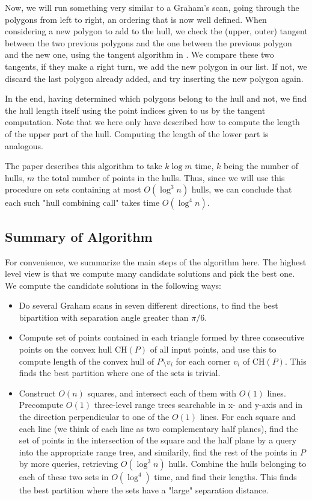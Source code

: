 \documentclass{article}
\begin{document}
Now, we will run something very similar to a Graham's scan, going through the polygons from left to right, an ordering that is now well defined. When considering a new polygon to add to the hull, we check the (upper, outer) tangent between the two previous polygons and the one between the previous polygon and the new one, using the tangent algorithm in \cite{ks95}. We compare these two tangents, if they make a right turn, we add the new polygon in our list. If not, we discard the last polygon  already added, and try inserting the new polygon again.

In the end, having determined which polygons belong to the hull and not, we find the hull length itself using the point indices given to us by the tangent computation. Note that we here only have described how to compute the length of the upper part of the hull. Computing the length of the lower part is analogous. 

The paper \cite{abb17} describes this algorithm to take $k \log m$ time, $k$ being the number of hulls, $m$ the total number of points in the hulls. Thus, since we will use this procedure on sets containing at most $O(\log^3 n)$ hulls, we can conclude that each such "hull combining call" takes time $O(\log^4 n)$.

\subsection{Summary of Algorithm} \label{sub:summary_of_algorithm}

For convenience, we summarize the main steps of the algorithm here. The highest level view is that we compute many candidate solutions and pick the best one. We compute the candidate solutions in the following ways:

\begin{itemize}
    \item Do several Graham scans in seven different directions, to find the best bipartition with separation angle greater than $\pi / 6$.
    \item Compute set of points contained in each triangle formed by three consecutive points on the convex hull $\text{CH}(P)$ of all input points, and use this to compute length of the convex hull of $P \setminus v_i$ for each corner $v_i$ of $\text{CH}(P)$. This finds the best partition where one of the sets is trivial.
    \item Construct $O(n)$ squares, and intersect each of them with $O(1)$ lines. Precompute $O(1)$ three-level range trees searchable in x- and y-axis and in the direction perpendicular to one of the $O(1)$ lines. For each square and each line (we think of each line as two complementary half planes), find the set of points in the intersection of the square and the half plane by a query into the appropriate range tree, and similarily, find the rest of the points in $P$ by more queries, retrieving $O(\log^3 n)$ hulls. Combine the hulls belonging to each of these two sets in $O(\log^4)$ time, and find their lengths. This finds the best partition where the sets have a "large" separation distance.
\end{itemize}
\end{document}
